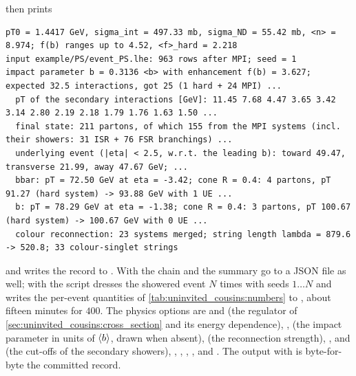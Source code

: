 then prints
\begin{verbatim}
pT0 = 1.4417 GeV, sigma_int = 497.33 mb, sigma_ND = 55.42 mb, <n> = 8.974; f(b) ranges up to 4.52, <f>_hard = 2.218
input example/PS/event_PS.lhe: 963 rows after MPI; seed = 1
impact parameter b = 0.3136 <b> with enhancement f(b) = 3.627; expected 32.5 interactions, got 25 (1 hard + 24 MPI) ...
  pT of the secondary interactions [GeV]: 11.45 7.68 4.47 3.65 3.42 3.14 2.80 2.19 2.18 1.79 1.76 1.63 1.50 ...
  final state: 211 partons, of which 155 from the MPI systems (incl. their showers: 31 ISR + 76 FSR branchings) ...
  underlying event (|eta| < 2.5, w.r.t. the leading b): toward 49.47, transverse 21.99, away 47.67 GeV; ...
  bbar: pT = 72.50 GeV at eta = -3.42; cone R = 0.4: 4 partons, pT 91.27 (hard system) -> 93.88 GeV with 1 UE ...
  b: pT = 78.29 GeV at eta = -1.38; cone R = 0.4: 3 partons, pT 100.67 (hard system) -> 100.67 GeV with 0 UE ...
  colour reconnection: 23 systems merged; string length lambda = 879.6 -> 520.8; 33 colour-singlet strings
\end{verbatim}
and writes the record to . With
 the chain and the summary go to a JSON file as well; with
 the script dresses the showered event $N$ times with
seeds $1\ldots N$ and writes the per-event quantities of
\cref{tab:uninvited_cousins:numbers} to , about fifteen
minutes for $400$. The physics options are  and
 (the regulator of \cref{sec:uninvited_cousins:cross_section}
and its energy dependence), ,  (the
impact parameter in units of $\langle b\rangle$, drawn when absent), 
(the reconnection strength), ,  and
 (the cut-offs of the secondary showers), ,
, , ,  and
. The output with  is
byte-for-byte the committed record.

